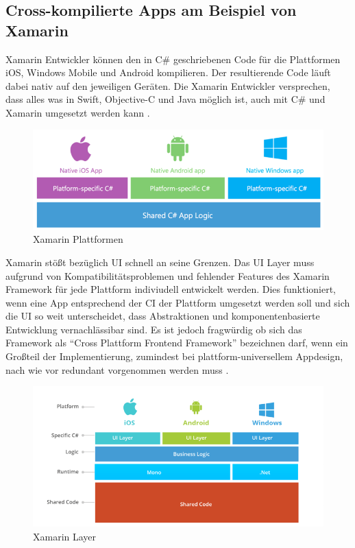 \subsection{Cross-kompilierte Apps am Beispiel von Xamarin}

Xamarin Entwickler können den in C\# geschriebenen Code für die Plattformen iOS, Windows Mobile und Android kompilieren.
Der resultierende Code läuft dabei nativ auf den jeweiligen Geräten.
Die Xamarin Entwickler versprechen, dass alles was in Swift, Objective-C und
Java möglich ist, auch mit C\# und Xamarin umgesetzt werden kann \cite{projectxamarin}.

\begin{figure}[ht]
 \centering
 \includegraphics[width=0.8\linewidth]{kapitel2/csharp_xamarin.png}
 \caption{Xamarin Plattformen \cite{7Reas20:online}}
\end{figure}
\vspace{1cm}

\noindent
Xamarin stößt bezüglich \ac{UI} schnell an seine Grenzen. Das \ac{UI} Layer muss aufgrund von Kompatibilitätsproblemen und fehlender Features des Xamarin Framework
für jede Plattform indiviudell entwickelt werden. Dies funktioniert, wenn eine App entsprechend der \ac{CI} der Plattform umgesetzt werden soll und sich die \ac{UI} so weit unterscheidet,
dass Abstraktionen und komponentenbasierte Entwicklung vernachlässibar sind. Es ist jedoch fragwürdig ob sich das Framework als ``Cross Plattform Frontend Framework'' bezeichnen darf,
wenn ein Großteil der Implementierung, zumindest bei plattform-universellem Appdesign, nach wie vor redundant vorgenommen werden muss \cite{7Reas20:online}.

\begin{figure}[ht]
 \centering
 \includegraphics[width=0.8\linewidth]{kapitel2/xamarin_ui_blocker.png}
 \caption{Xamarin Layer \cite{7Reas20:online}}
\end{figure}

